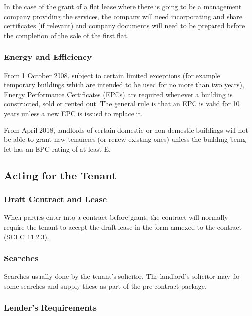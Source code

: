 \documentclass[
]{article}
\begin{document}
In the case of the grant of a flat lease where there is going to be a
management company providing the services, the company will need
incorporating and share certificates (if relevant) and company documents
will need to be prepared before the completion of the sale of the first
flat.

\hypertarget{energy-and-efficiency}{%
\subsubsection{Energy and Efficiency}\label{energy-and-efficiency}}

From 1 October 2008, subject to certain limited exceptions (for example
temporary buildings which are intended to be used for no more than two
years), Energy Performance Certificates (EPCs) are required whenever a
building is constructed, sold or rented out. The general rule is that an
EPC is valid for 10 years unless a new EPC is issued to replace it.

From April 2018, landlords of certain domestic or non-domestic buildings
will not be able to grant new tenancies (or renew existing ones) unless
the building being let has an EPC rating of at least E.

\hypertarget{acting-for-the-tenant}{%
\subsection{Acting for the Tenant}\label{acting-for-the-tenant}}

\hypertarget{draft-contract-and-lease}{%
\subsubsection{Draft Contract and
Lease}\label{draft-contract-and-lease}}

When parties enter into a contract before grant, the contract will
normally require the tenant to accept the draft lease in the form
annexed to the contract (SCPC 11.2.3).

\hypertarget{searches}{%
\subsubsection{Searches}\label{searches}}

Searches usually done by the tenant's solicitor. The landlord's
solicitor may do some searches and supply these as part of the
pre-contract package.

\hypertarget{lenders-requirements}{%
\subsubsection{Lender's Requirements}\label{lenders-requirements}}
\end{document}
